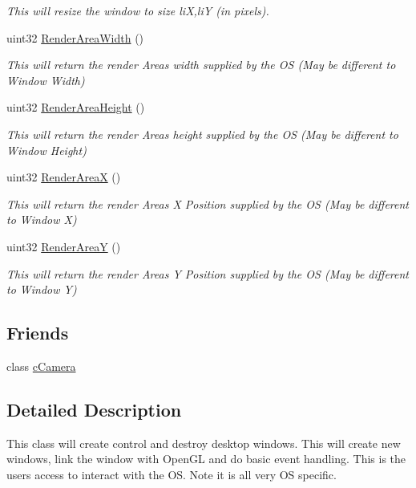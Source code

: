 \begin{DoxyCompactItemize}
\begin{DoxyCompactList}\small\item\em This will resize the window to size liX,liY (in pixels). \end{DoxyCompactList}\item 
\hypertarget{classc_window_a4930935cab62c77e3eca1daf6eff58bd}{
uint32 \hyperlink{classc_window_a4930935cab62c77e3eca1daf6eff58bd}{RenderAreaWidth} ()}
\label{classc_window_a4930935cab62c77e3eca1daf6eff58bd}

\begin{DoxyCompactList}\small\item\em This will return the render Areas width supplied by the OS (May be different to Window Width) \end{DoxyCompactList}\item 
\hypertarget{classc_window_afa0cbc2da583d467144875afd4caf368}{
uint32 \hyperlink{classc_window_afa0cbc2da583d467144875afd4caf368}{RenderAreaHeight} ()}
\label{classc_window_afa0cbc2da583d467144875afd4caf368}

\begin{DoxyCompactList}\small\item\em This will return the render Areas height supplied by the OS (May be different to Window Height) \end{DoxyCompactList}\item 
\hypertarget{classc_window_acdeb884ea654a533a2dae9155a7cec2d}{
uint32 \hyperlink{classc_window_acdeb884ea654a533a2dae9155a7cec2d}{RenderAreaX} ()}
\label{classc_window_acdeb884ea654a533a2dae9155a7cec2d}

\begin{DoxyCompactList}\small\item\em This will return the render Areas X Position supplied by the OS (May be different to Window X) \end{DoxyCompactList}\item 
\hypertarget{classc_window_a85344f799dd7437bc0c885b610f16ae1}{
uint32 \hyperlink{classc_window_a85344f799dd7437bc0c885b610f16ae1}{RenderAreaY} ()}
\label{classc_window_a85344f799dd7437bc0c885b610f16ae1}

\begin{DoxyCompactList}\small\item\em This will return the render Areas Y Position supplied by the OS (May be different to Window Y) \end{DoxyCompactList}\end{DoxyCompactItemize}
\subsection*{Friends}
\begin{DoxyCompactItemize}
\item 
\hypertarget{classc_window_a930db2797d94f26b57e430e155ad81ba}{
class \hyperlink{classc_window_a930db2797d94f26b57e430e155ad81ba}{cCamera}}
\label{classc_window_a930db2797d94f26b57e430e155ad81ba}

\end{DoxyCompactItemize}


\subsection{Detailed Description}
This class will create control and destroy desktop windows. This will create new windows, link the window with OpenGL and do basic event handling. This is the users access to interact with the OS. Note it is all very OS specific. 